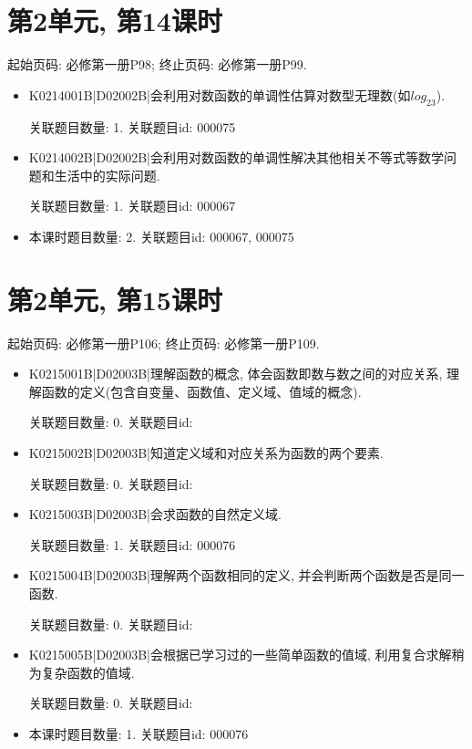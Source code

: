 \section*{第2单元, 第14课时}
起始页码: 必修第一册P98; 终止页码: 必修第一册P99.
\begin{itemize}
\item K0214001B|D02002B|会利用对数函数的单调性估算对数型无理数(如$log_23$).

关联题目数量: 1. 关联题目id: 000075

\item K0214002B|D02002B|会利用对数函数的单调性解决其他相关不等式等数学问题和生活中的实际问题.

关联题目数量: 1. 关联题目id: 000067

\item 本课时题目数量: 2. 关联题目id: 000067, 000075

\end{itemize}

\section*{第2单元, 第15课时}
起始页码: 必修第一册P106; 终止页码: 必修第一册P109.
\begin{itemize}
\item K0215001B|D02003B|理解函数的概念, 体会函数即数与数之间的对应关系, 理解函数的定义(包含自变量、函数值、定义域、值域的概念).

关联题目数量: 0. 关联题目id: 

\item K0215002B|D02003B|知道定义域和对应关系为函数的两个要素.

关联题目数量: 0. 关联题目id: 

\item K0215003B|D02003B|会求函数的自然定义域.

关联题目数量: 1. 关联题目id: 000076

\item K0215004B|D02003B|理解两个函数相同的定义, 并会判断两个函数是否是同一函数.

关联题目数量: 0. 关联题目id: 

\item K0215005B|D02003B|会根据已学习过的一些简单函数的值域, 利用复合求解稍为复杂函数的值域.

关联题目数量: 0. 关联题目id: 

\item 本课时题目数量: 1. 关联题目id: 000076

\end{itemize}

